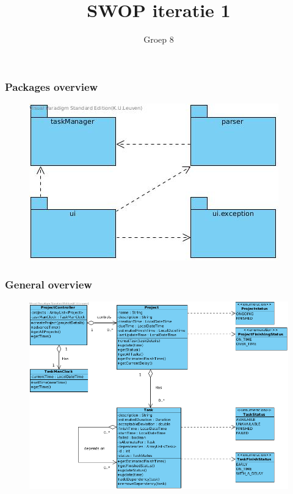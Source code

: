 \documentclass{beamer}
\title[SWOP iteratie 1]{SWOP iteratie 1} %
\author{Groep 8} %
\institute[KULeuven] %
{\\ %
\medskip
\textit{} %
}
\date{} %
\begin{document}
\begin{frame}
\titlepage %
\end{frame}



\begin{frame}
\frametitle{Packages overview}
\begin{figure}[htp]
\centering
\includegraphics[scale=0.6]{Presentatie_iteratie1/figures/package_overview.jpg}

\label{}
\end{figure}
\end{frame}
\begin{frame}
\frametitle {General overview}

\begin{figure}[htp]
\centering
\includegraphics[scale=0.50]{Presentatie_iteratie1/figures/Class_Diagram.png}

\label{}
\end{figure}
\end{frame}
\end{document}
